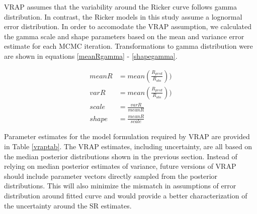 \documentclass{article}
\begin{document}
VRAP assumes that the variability around the Ricker curve follows gamma distribution. In contrast,  the Ricker models in this study assume a lognormal error distribution. In order to accomodate the VRAP assumption, we calculated the gamma scale and shape parameters based on the mean and variance  error estimate for each MCMC iteration. Transformations to gamma distribution were are shown in equations \ref{meanRgamma} - \ref{shapegamma}.   


\begin{align} 
\label{meanRgamma}
meanR &= mean(\frac{R_{pred}}{R_{obs}}))\\
\label{varRgamma}
varR &= mean(\frac{R_{pred}}{R_{obs}}))\\
\label{scalegamma}
scale &= \frac{varR}{meanR} \\
\label{shapegamma}
shape &= \frac{meanR}{scale} 
\end{align}


 Parameter estimates for the model formulation required by VRAP  are provided in Table \ref{vraptab}. The VRAP estimates, including uncertainty, are all based on the median posterior distributions shown in the previous section. Instead of relying on median posterior estimates of variance, future versions of VRAP should include parameter vectors directly sampled from the posterior distributions. This will also minimize the mismatch in assumptions of error distribution around fitted curve and would provide a better characterization of the uncertainty around the SR estimates.











%






\end{document}
